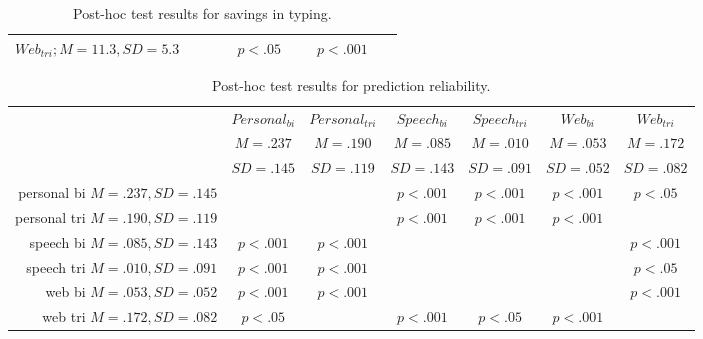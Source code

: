 \documentclass{sigchi}
\begin{document}
\begin{table}
\begin{tabular}{|r|c|c|c|c|c|c|}
    $Web_{tri};M=11.3,SD=5.3$      & ~                                            & ~                                             & $p<.05$                                   & ~                                           & $p<.001$                               & ~                                        \\ \hline
    \end{tabular}
    \caption {Post-hoc test results for savings in typing.}
    \label{tab:savings}
\end{table}

\begin{table}
    \centering
    \begin{tabular}{|r|c|c|c|c|c|c|}
    \hline
    ~ & $Personal_{bi}$ & $Personal_{tri}$ & $Speech_{bi}$ & $Speech_{tri}$ & $Web_{bi}$ & $Web_{tri}$ \\
    ~ & $M=.237$ & $M=.190$ & $M=.085$ & $M=.010$ & $M=.053$ & $M=.172$ \\
    ~ & $SD=.145$ & $SD=.119$ & $SD=.143$ & $SD=.091$ & $SD=.052$ & $SD=.082$ \\ \hline
    personal bi $M=.237,SD=.145$  & ~           & ~            & $p<.001$  & $p<.001$   & $p<.001$ & $p<.05$  \\ \hline
    personal tri $M=.190,SD=.119$ & ~           & ~            & $p<.001$  & $p<.001$   & $p<.001$ & ~        \\ \hline
    speech bi $M=.085,SD=.143$    & $p<.001$    & $p<.001$     & ~         & ~          & ~        & $p<.001$ \\ \hline
    speech tri $M=.010,SD=.091$   & $p<.001$    & $p<.001$     & ~         & ~          & ~        & $p<.05$  \\ \hline
    web bi $M=.053,SD=.052$       & $p<.001$    & $p<.001$     & ~         & ~          & ~        & $p<.001$ \\ \hline
    web tri $M=.172,SD=.082$       & $p<.05$     & ~            & $p<.001$  & $p<.05$    & $p<.001$ & ~        \\ \hline
    \end{tabular}
    \caption {Post-hoc test results for prediction reliability.}
    \label{tab:reliability}
\end{table}

\endgroup
\end{document}
